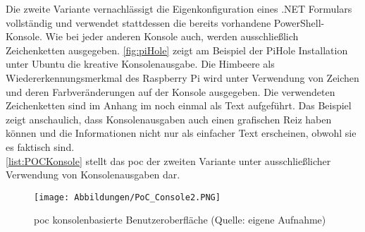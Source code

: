 Die zweite Variante vernachlässigt die Eigenkonfiguration eines .NET Formulars vollständig und verwendet stattdessen die bereits vorhandene PowerShell-Konsole. Wie bei jeder anderen Konsole auch, werden ausschließlich Zeichenketten ausgegeben. \autoref{fig:piHole} zeigt am Beispiel der PiHole Installation unter Ubuntu die kreative Konsolenausgabe. Die Himbeere als Wiedererkennungsmerkmal des Raspberry Pi wird unter Verwendung von Zeichen und deren Farbveränderungen auf der Konsole ausgegeben. Die verwendeten Zeichenketten sind im Anhang im  noch einmal als Text aufgeführt. Das Beispiel zeigt anschaulich, dass Konsolenausgaben auch einen grafischen Reiz haben können und die Informationen nicht nur als einfacher Text erscheinen, obwohl sie es faktisch sind.\medskip\\
\autoref{list:POCKonsole} stellt das \acrlong{poc} der zweiten Variante unter ausschließlicher Verwendung von Konsolenausgaben dar.

\newpage 
\begin{wrapfigure}[25]{l}{7.7cm}
    \centering
    \texttt{[image: Abbildungen/PoC\_Console2.PNG]}\caption[Proof of Concept konsolenbasierte Benutzeroberfläche]{\acrshort{poc} konsolenbasierte Benutzeroberfläche (Quelle: eigene Aufnahme)}
    \label{fig:TestUIKonsole}
\end{wrapfigure}

